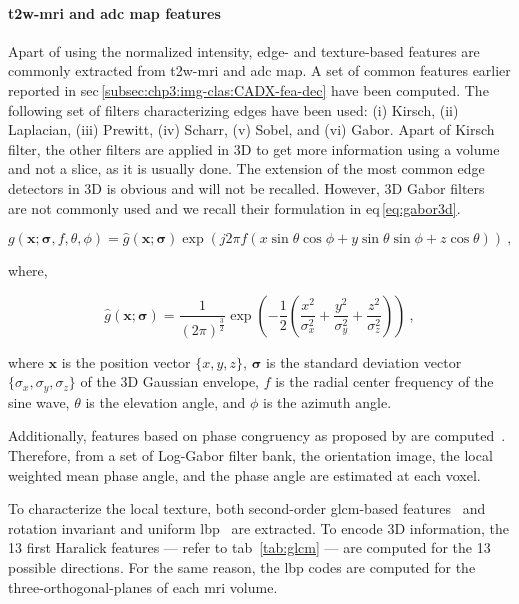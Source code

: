 \paragraph{\ac{t2w}-\ac{mri} and \ac{adc} map features}
Apart of using the normalized intensity, edge- and texture-based features are commonly extracted from \ac{t2w}-\ac{mri} and \ac{adc} map.
A set of common features earlier reported in \acs*{sec}\,\ref{subsec:chp3:img-clas:CADX-fea-dec} have been computed.
The following set of filters characterizing edges have been used: (i) Kirsch, (ii) Laplacian, (iii) Prewitt, (iv) Scharr, (v) Sobel, and (vi) Gabor.
Apart of Kirsch filter, the other filters are applied in 3D to get more information using a volume and not a slice, as it is usually done.
The extension of the most common edge detectors in 3D is obvious and will not be recalled.
However, 3D Gabor filters~\cite{wang2005face} are not commonly used and we recall their formulation in \acs*{eq}\,\eqref{eq:gabor3d}.

\begin{equation}
  g(\mathbf{x};\boldsymbol{\sigma},f,\theta,\phi) = \hat{g}(\mathbf{x};\boldsymbol{\sigma}) \exp(j 2 \pi f \left( x \sin \theta \cos \phi + y \sin \theta \sin \phi + z \cos \theta \right)) \ ,
  \label{eq:gabor3d}
\end{equation}

\noindent where,

\begin{equation}
  \hat{g}(\mathbf{x};\boldsymbol{\sigma}) = \frac{1}{{\left(2 \pi\right)}^{\frac{3}{2}}} \exp \left( -\frac{1}{2} \left( \frac{x^2}{\sigma_x^2} + \frac{y^2}{\sigma_y^2} + \frac{z^2}{\sigma_z^2} \right) \right) \ ,
  \label{eq:gabor3dgaussian}
\end{equation}

\noindent where $\mathbf{x}$ is the position vector $\{x,y,z\}$, $\boldsymbol{\sigma}$ is the standard deviation vector $\{\sigma_x,\sigma_y,\sigma_z\}$ of the 3D Gaussian envelope, $f$ is the radial center frequency of the sine wave, $\theta$ is the elevation angle, and $\phi$ is the azimuth angle.

Additionally, features based on phase congruency as proposed by \citeauthor{kovesi1999image} are computed~\cite{kovesi1999image}.
Therefore, from a set of Log-Gabor filter bank, the orientation image, the local weighted mean phase angle, and the phase angle are estimated at each voxel.

To characterize the local texture, both second-order \ac{glcm}-based features~\cite{Haralick1973} and rotation invariant and uniform \ac{lbp}~\cite{ojala2002multiresolution} are extracted.
To encode 3D information, the 13 first Haralick features --- refer to \acs{tab}~\ref{tab:glcm} --- are computed for the 13 possible directions.
For the same reason, the \ac{lbp} codes are computed for the three-orthogonal-planes of each \ac{mri} volume.

